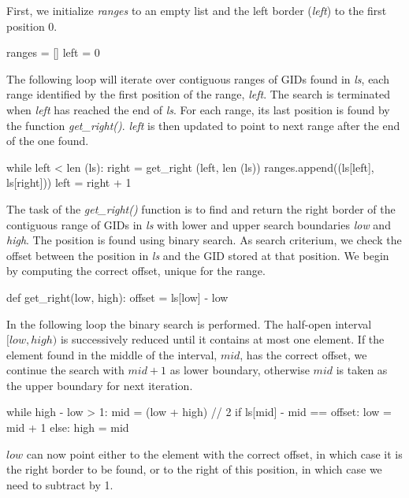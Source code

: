 \documentclass{frontiersSCNS} %
\begin{document}
First, we initialize \emph{ranges} to an empty list and the left
border (\emph{left}) to the first position 0.

\begin{pythoncode}
ranges = []
left = 0
\end{pythoncode}

The following loop will iterate over contiguous ranges of GIDs found
in \emph{ls}, each range identified by the first position of the
range, \emph{left}. The search is terminated when \emph{left} has
reached the end of \emph{ls}.  For each range, its last position is
found by the function \emph{get\_right()}. \emph{left} is then updated
to point to next range after the end of the one found.

\begin{pythoncode}
while left < len (ls):
    right = get_right (left, len (ls))
    ranges.append((ls[left], ls[right]))
    left = right + 1
\end{pythoncode}

The task of the \emph{get\_right()} function is to find and return the
right border of the contiguous range of GIDs in \emph{ls} with lower
and upper search boundaries \emph{low} and \emph{high}. The position
is found using binary search. As search criterium, we check the offset
between the position in \emph{ls} and the GID stored at that
position. We begin by computing the correct offset, unique for the
range.

\begin{pythoncode}
def get_right(low, high):
    offset = ls[low] - low
\end{pythoncode}

In the following loop the binary search is performed. The half-open
interval $[low, high)$ is successively reduced until it contains at
most one element. If the element found in the middle of the
interval, $mid$, has the correct offset, we continue the search with
$mid + 1$ as lower boundary, otherwise $mid$ is taken as the upper
boundary for next iteration.

\begin{pythoncode}
    while high - low > 1:
        mid = (low + high) // 2
        if ls[mid] - mid == offset:
            low = mid + 1
        else:
            high = mid
\end{pythoncode}

$low$ can now point either to the element with the correct offset, in
which case it is the right border to be found, or to the right of this
position, in which case we need to subtract by 1.
\end{document}
